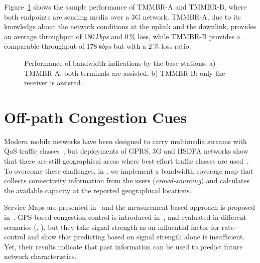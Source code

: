 Figure~\ref{fig:tmmbn} shows the sample performance of TMMBR-A and TMMBR-B,
where both endpoints are sending media over a 3G network. TMMBR-A, due to its
knowledge about the network conditions at the uplink and the downlink, provides
an average throughput of 180\,\emph{kbps} and 0\,\% loss, while TMMBR-B provides a
comparable throughput of 178\,\emph{kbps} but with a 2\,\% loss ratio.


\begin{figure}[!t]
  \centerline{
  }
  \caption{Performance of bandwidth indications by the base
  stations. a) TMMBR-A: both terminals are assisted, b) TMMBR-B: only the receiver
  is assisted.}
  \label{fig:tmmbn}
\end{figure}


\section{Off-path Congestion Cues}


Modern mobile networks have been designed to carry multimedia streams with QoS
traffic classes~\cite{3gpp.23.107}, but deployments of GPRS, 3G and HSDPA
networks show that there are still geographical areas where best-effort
traffic classes are used~\cite{Curcio:glass, 6012045}. To overcome these challenges, in
, we implement a bandwidth coverage map that collects
connectivity information from the users (\emph {crowd-sourcing}) and
calculates the available capacity at the reported geographical locations.

Service Maps are presented in~\cite{1630563} and the measurement-based
approach is proposed in~\cite{Aravinda:2008p14}. GPS-based congestion control
is introduced in~\cite{Yao:2008p21}, and evaluated in different
scenarios (\cite{Yao:2009p57}, \cite{Yao:2010p64}), but they take signal
strength as an influential factor for rate-control and show that predicting
based on signal strength alone is insufficient. Yet, their results indicate
that past information can be used to predict future network characteristics.

